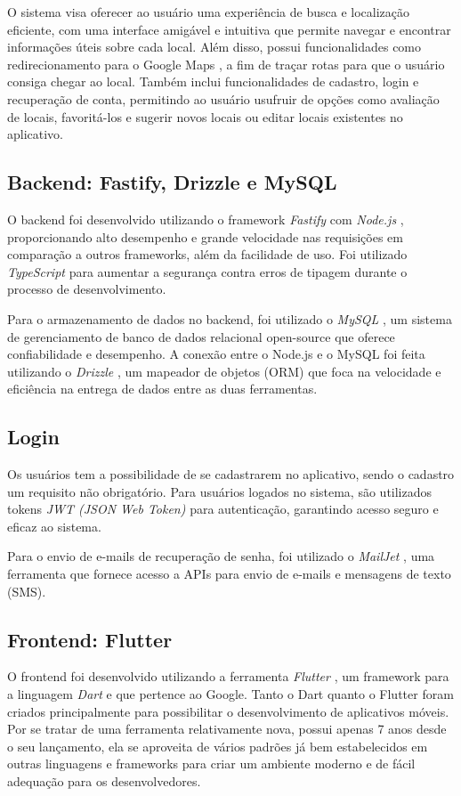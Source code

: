O sistema visa oferecer ao usuário uma experiência de busca e localização eficiente, com uma interface amigável e intuitiva que permite navegar e encontrar informações úteis sobre cada local. Além disso, possui funcionalidades como redirecionamento para o Google Maps \cite{maps2005}, a fim de traçar rotas para que o usuário consiga chegar ao local. Também inclui funcionalidades de cadastro, login e recuperação de conta, permitindo ao usuário usufruir de opções como avaliação de locais, favoritá-los e sugerir novos locais ou editar locais existentes no aplicativo.


\subsection{Backend: Fastify, Drizzle e MySQL}
O backend foi desenvolvido utilizando o framework \textit{Fastify} \cite{fastify} com \textit{Node.js} \cite{nodejs}, proporcionando alto desempenho e grande velocidade nas requisições em comparação a outros frameworks, além da facilidade de uso. Foi utilizado \textit{TypeScript} \cite{typescript} para aumentar a segurança contra erros de tipagem durante o processo de desenvolvimento.

Para o armazenamento de dados no backend, foi utilizado o \textit{MySQL} \cite{mysql}, um sistema de gerenciamento de banco de dados relacional open-source que oferece confiabilidade e desempenho. A conexão entre o Node.js e o MySQL foi feita utilizando o \textit{Drizzle} \cite{drizzle}, um mapeador de objetos (ORM) que foca na velocidade e eficiência na entrega de dados entre as duas ferramentas.

\subsection{Login}
Os usuários tem a possibilidade de se cadastrarem no aplicativo, sendo o cadastro um requisito não obrigatório. Para usuários logados no sistema, são utilizados tokens \textit{JWT (JSON Web Token)} \cite{jwt} para autenticação, garantindo acesso seguro e eficaz ao sistema.

Para o envio de e-mails de recuperação de senha, foi utilizado o \textit{MailJet} \cite{mailjet}, uma ferramenta que fornece acesso a APIs para envio de e-mails e mensagens de texto (SMS).

\subsection{Frontend: Flutter}
O frontend foi desenvolvido utilizando a ferramenta \textit{Flutter} \cite{flutter}, um framework para a linguagem \textit{Dart} \cite{dart} e que pertence ao Google. Tanto o Dart quanto o Flutter foram criados principalmente para possibilitar o desenvolvimento de aplicativos móveis. Por se tratar de uma ferramenta relativamente nova, possui apenas 7 anos desde o seu lançamento, ela se aproveita de vários padrões já bem estabelecidos em outras linguagens e frameworks para criar um ambiente moderno e de fácil adequação para os desenvolvedores.

